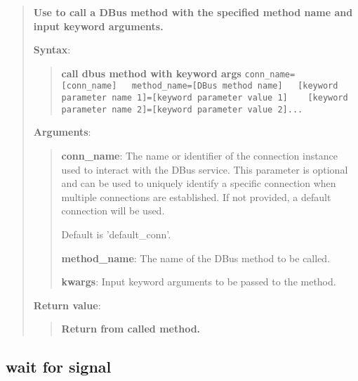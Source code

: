 \begin{quote}
\textbf{Use to call a DBus method with the specified method name and input keyword arguments.}

\textbf{Syntax}:
\begin{quote}
\textbf{call dbus method with keyword args}
\texttt{conn\_name={[}conn\_name{]}\ \ \ method\_name={[}DBus method name{]}\ \ \ [keyword parameter name 1]={[}keyword parameter value 1{]} \ \ \ [keyword parameter name 2]={[}keyword parameter value 2{]}...}
\end{quote}

\textbf{Arguments}:

\begin{quote}
\textbf{conn\_name}: The name or identifier of the connection instance used to interact with the DBus service.
  This parameter is optional and can be used to uniquely identify a specific connection
  when multiple connections are established. If not provided, a default connection will be used.
  
  Default is 'default\_conn'.
  
\vspace{\baselineskip}

\textbf{method\_name}: The name of the DBus method to be called.

\vspace{\baselineskip}

\textbf{kwargs}: Input keyword arguments to be passed to the method.
\end{quote}

\textbf{Return value}:

\begin{quote}
\textbf{Return from called method.}
\end{quote}
\end{quote}


\hypertarget{description-wait-for-signal}{%
\subsection{\texorpdfstring{\textbf{wait for signal}}{wait for signal}}\label{description-wait-for-signal}}

